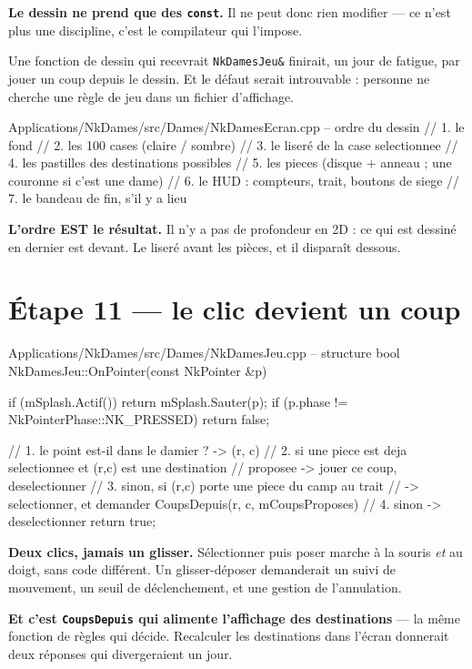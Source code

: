 \begin{nkretenir}
\textbf{Le dessin ne prend que des \texttt{const}.} Il ne peut donc rien
modifier --- ce n'est plus une discipline, c'est le compilateur qui l'impose.

Une fonction de dessin qui recevrait \texttt{NkDamesJeu\&} finirait, un jour de
fatigue, par jouer un coup depuis le dessin. Et le défaut serait introuvable :
personne ne cherche une règle de jeu dans un fichier d'affichage.
\end{nkretenir}

\begin{nkcode}{Applications/NkDames/src/Dames/NkDamesEcran.cpp -- ordre du dessin}
// 1. le fond
// 2. les 100 cases (claire / sombre)
// 3. le liseré de la case selectionnee
// 4. les pastilles des destinations possibles
// 5. les pieces (disque + anneau ; une couronne si c'est une dame)
// 6. le HUD : compteurs, trait, boutons de siege
// 7. le bandeau de fin, s'il y a lieu
\end{nkcode}

\begin{nkretenir}
\textbf{L'ordre EST le résultat.} Il n'y a pas de profondeur en 2D : ce qui est
dessiné en dernier est devant. Le liseré avant les pièces, et il disparaît
dessous.
\end{nkretenir}

\section{Étape 11 --- le clic devient un coup}

\begin{nkcode}{Applications/NkDames/src/Dames/NkDamesJeu.cpp -- structure}
bool NkDamesJeu::OnPointer(const NkPointer &p) {
    if (mSplash.Actif())            { return mSplash.Sauter(p); }
    if (p.phase != NkPointerPhase::NK_PRESSED) { return false; }

    // 1. le point est-il dans le damier ? -> (r, c)
    // 2. si une piece est deja selectionnee et (r,c) est une destination
    //       proposee -> jouer ce coup, deselectionner
    // 3. sinon, si (r,c) porte une piece du camp au trait
    //       -> selectionner, et demander CoupsDepuis(r, c, mCoupsProposes)
    // 4. sinon -> deselectionner
    return true;
}
\end{nkcode}

\begin{nkretenir}
\textbf{Deux clics, jamais un glisser.} Sélectionner puis poser marche à la
souris \emph{et} au doigt, sans code différent. Un glisser-déposer demanderait un
suivi de mouvement, un seuil de déclenchement, et une gestion de l'annulation.

\textbf{Et c'est \texttt{CoupsDepuis} qui alimente l'affichage des destinations}
--- la même fonction de règles qui décide. Recalculer les destinations dans
l'écran donnerait deux réponses qui divergeraient un jour.
\end{nkretenir}


